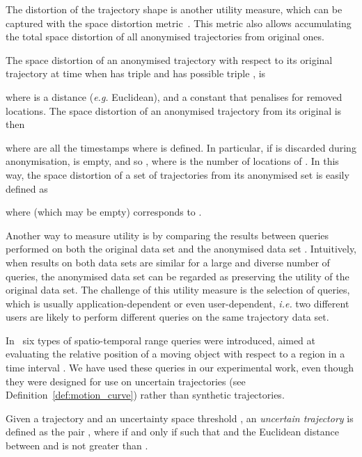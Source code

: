 The distortion of the trajectory shape is another utility measure,
which can be captured with the
space distortion metric~\cite[Sec.VI.B]{abul08}. This metric
also allows accumulating the total space distortion of all anonymised
trajectories from original ones.

\begin{definition}\label{def:distortion}
The space dis\-tort\-ion of an a\-no\-nym\-ised trajectory
 with respect to its original trajectory  at
time  when  has triple  and  has
possible triple , is

where  is a distance ({\em e.g.} Euclidean), and  a constant that
penalises for removed locations.
The space distortion of an anonymised trajectory
 from its original  is then

where  are all the timestamps where  is defined. In particular, if
 is discarded during anonymisation,  is empty, and so
, where  is the number of locations of .
In this way, the space distortion of a set of trajectories 
from its anonymised set  is easily defined as

where  (which may be empty) corresponds to .
\end{definition}





Another way to measure utility is by comparing the results between queries
performed on both the original data set  and the
anonymised data set . Intuitively, when results
on both data sets are similar for a large and diverse number of queries,
the anonymised data set can be regarded as preserving
the utility of the original data set. The challenge of this utility
measure is the selection of queries, which is usually
application-dependent or even user-dependent, {\em i.e.}
two different users are likely
to perform different queries on the same trajectory data set.

In~\cite{Trajcevski:2004:MUM:1016028.1016030} six types of spatio-temporal
range queries were introduced, aimed at evaluating the relative position
of a moving object with respect to a region  in a time
interval . We have used these queries
in our experimental work, even though they were designed
for use on uncertain trajectories
(see Definition~\ref{def:motion_curve})
rather than synthetic trajectories.

\begin{definition} \label{def:motion_curve}
Given a trajectory  and an uncertainty space threshold ,
an \emph{uncertain trajectory}  is defined as
the pair ,
where  if and only if  such that
 and the Euclidean distance between  and 
is not greater than .
\end{definition}


